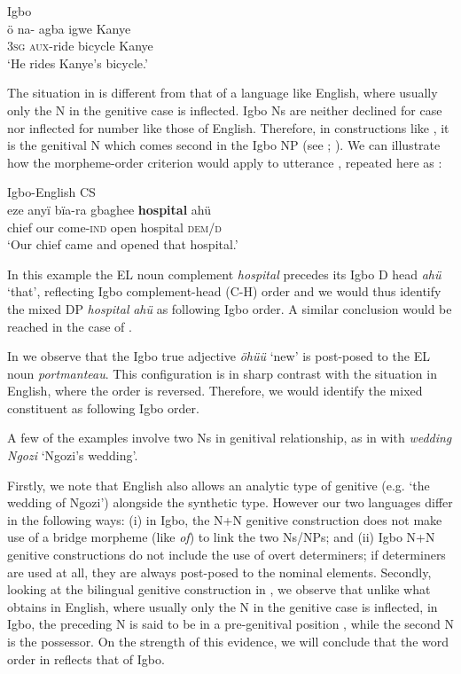 \documentclass[output=paper]{langsci/langscibook}
\begin{document}
\ea
{Igbo}\\
\gll ö    na- agba  \textsubscript{} igwe    Kanye\\
     \textsc{3sg}    \textsc{aux}-ride  bicycle    Kanye\\
\glt ‘He rides Kanye’s bicycle.’
\z

The situation in  is different from that of a language like English, where usually only the N in the genitive case is inflected. Igbo Ns are neither declined for case nor inflected for number like those of English. Therefore, in constructions like , it is the genitival N which comes second in the Igbo NP (see \citealt{Emenanjo1978}; \citealt{Uwalaka1997}). We can illustrate how the morpheme-order criterion would apply to utterance , repeated here as :

\ea
{Igbo-English CS}\\
\gll eze    anyï  bïa-ra        gbaghee  \textbf{hospital}  ahü \textbf{} \\
     chief   our  come-\textsc{ind}  open        hospital    \textsc{dem/d}\\
\glt ‘Our chief came and opened that hospital.’
\z

In this example the EL noun complement \textit{hospital} precedes its Igbo D head \textit{ahü} ‘that’, reflecting Igbo complement-head (C-H) order and we would thus identify the mixed DP \textit{hospital}\textbf{\textit{}} \textit{ahü} as following Igbo order. A similar conclusion would be reached in the case of .

In  we observe that the Igbo true adjective \textit{öhüü} ‘new’ is post-posed to the EL noun \textit{portmanteau}. This configuration is in sharp contrast with the situation in English, where the order is reversed. Therefore, we would identify the mixed constituent as following Igbo order. 

A few of the examples involve two Ns in genitival relationship, as in  with \textit{wedding Ngozi} ‘Ngozi’s wedding’. 

Firstly, we note that English also allows an analytic type of genitive (e.g. ‘the wedding of Ngozi’) alongside the synthetic type. However our two languages differ in the following ways: (i) in Igbo, the N+N genitive construction does not make use of a bridge morpheme (like \textit{of}) to link the two Ns/NPs; and (ii) Igbo N+N genitive constructions do not include the use of overt determiners; if determiners are used at all, they are always post-posed to the nominal elements. Secondly, looking at the bilingual genitive construction in , we observe that unlike what obtains in English, where usually only the N in the genitive case is inflected, in Igbo, the preceding N is said to be in a pre-genitival position \citep{Uwalaka1997}, while the second N is the possessor. On the strength of this evidence, we will conclude that the word order in  reflects that of Igbo. 
\end{document}
